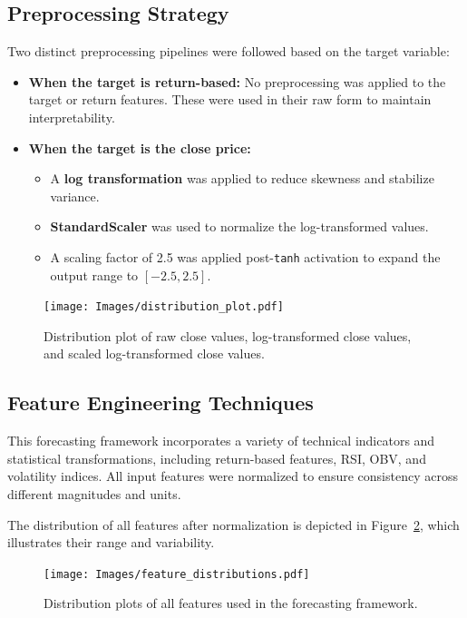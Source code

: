 \subsection{Preprocessing Strategy}
Two distinct preprocessing pipelines were followed based on the target variable:
\begin{itemize}
    \item \textbf{When the target is return-based:} No preprocessing was applied to the target or return features. These were used in their raw form to maintain interpretability.
    \item \textbf{When the target is the close price:}
    \begin{itemize}
        \item A \textbf{log transformation} was applied to reduce skewness and stabilize variance.
        \item \textbf{StandardScaler} was used to normalize the log-transformed values.
        \item A scaling factor of 2.5 was applied post-\texttt{tanh} activation to expand the output range to $[-2.5, 2.5]$.
    \end{itemize}
\end{itemize}

\begin{figure}[h]
    \centering
    \texttt{[image: Images/distribution\_plot.pdf]}
    \caption{Distribution plot of raw close values, log-transformed close values, and scaled log-transformed close values.}
    \label{fig:distribution_plot}
\end{figure}

\subsection{Feature Engineering Techniques}
This forecasting framework incorporates a variety of technical indicators and statistical transformations, including return-based features, RSI, OBV, and volatility indices. All input features were normalized to ensure consistency across different magnitudes and units.

The distribution of all features after normalization is depicted in Figure~\ref{fig:feature_distributions}, which illustrates their range and variability.

\begin{figure}[h!]
    \centering
    \texttt{[image: Images/feature\_distributions.pdf]}
    \caption{Distribution plots of all features used in the forecasting framework.}
    \label{fig:feature_distributions}
\end{figure}

